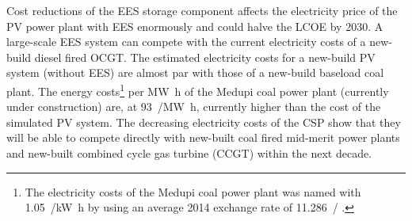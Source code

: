 


Cost reductions of the EES storage component affects the electricity price of the PV power plant with EES enormously and could halve the LCOE by 2030. A large-scale EES system can compete with the current electricity costs of a new-build diesel fired OCGT. The estimated electricity costs for a new-build PV system (without EES) are almost par with those of a new-build baseload coal plant. The energy costs\footnote{The electricity costs of the Medupi coal power plant was named with \SI{1.05}{\zar/\kilo\watt\hour} \cite{Nedbank2013} by using an average 2014 exchange rate of \SI{11.286}{\usd/\zar} \cite{IRS2015}.} per \si{\mega\watt\hour} of the Medupi coal power plant (currently under construction) are, at \SI{93}{\usd/\mega\watt\hour}, currently higher than the cost of the simulated PV system. The decreasing electricity costs of the CSP show that they will be able to compete directly with new-built coal fired mid-merit power plants and new-built combined cycle gas turbine (CCGT) within the next decade.

